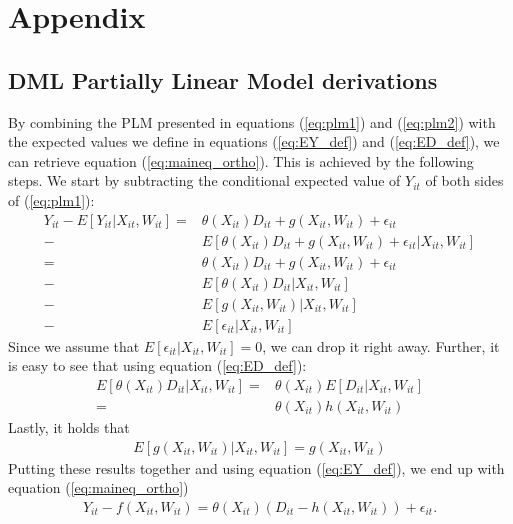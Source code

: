 \appendix 
\section{Appendix}
\subsection{DML Partially Linear Model derivations}\label{app:plm_deriv}
By combining the PLM presented in equations (\ref{eq:plm1}) and (\ref{eq:plm2}) with the expected values we define in equations (\ref{eq:EY_def}) and (\ref{eq:ED_def}), we can retrieve equation (\ref{eq:maineq_ortho}). This is achieved by the following steps. We start by subtracting the conditional expected value of $Y_{it}$ of both sides of (\ref{eq:plm1}):
\begin{align*}
    Y_{it}-E[Y_{it}|X_{it}, W_{it}]=&\theta(X_{it})D_{it}+g(X_{it}, W_{it})+\epsilon_{it} \\
    -&E \left[\theta(X_{it}) D_{it} + g(X_{it}, W_{it}) + \epsilon_{it} \vert X_{it}, W_{it}\right] \\
    =&\theta(X_{it})D_{it}+g(X_{it}, W_{it})+\epsilon_{it} \\
    -& E \left[\theta(X_{it})D_{it}|X_{it}, W_{it}\right] \\
    -& E \left[g(X_{it}, W_{it})|X_{it}, W_{it}\right] \\
    -& E \left[\epsilon_{it}|X_{it}, W_{it}\right]
\end{align*}
Since we assume that $E\left[\epsilon_{it}|X_{it}, W_{it}\right]=0$, we can drop it right away. Further, it is easy to see that using equation (\ref{eq:ED_def}): 
\begin{align*}
    E \left[\theta(X_{it})D_{it}|X_{it}, W_{it}\right]=&\theta(X_{it})E \left[D_{it}|X_{it}, W_{it}\right]\\
    =&\theta(X_{it})h(X_{it}, W_{it}) 
\end{align*}
Lastly, it holds that 
\begin{align*}
    E \left[g(X_{it}, W_{it})|X_{it}, W_{it}\right] = g(X_{it}, W_{it})
\end{align*}
Putting these results together and using equation (\ref{eq:EY_def}), we end up with equation (\ref{eq:maineq_ortho})
\begin{align*}
    Y_{it} - f(X_{it}, W_{it}) = \theta(X_{it})(D_{it}-h(X_{it}, W_{it})) + \epsilon_{it}.
\end{align*}

